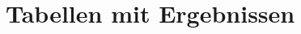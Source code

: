 \makeatletter
\let\savedchap\@makechapterhead
\def\@makechapterhead{\vspace*{-2cm}\savedchap}
\makeatletter


\chapter{Tabellen mit Ergebnissen}
\label{ch:Anhang_Tabellen}


\restoregeometry %
\let\@makechapterhead\savedchap %